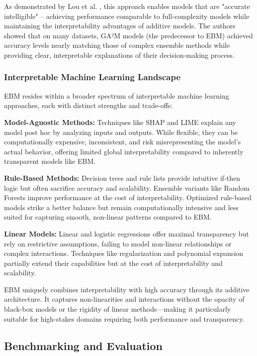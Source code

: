 \documentclass[12pt]{article}
\begin{document}
As demonstrated by Lou et al. \cite{lou2013}, this approach enables models that are "accurate intelligible" – achieving performance comparable to full-complexity models while maintaining the interpretability advantages of additive models. The authors showed that on many datasets, GA²M models (the predecessor to EBM) achieved accuracy levels nearly matching those of complex ensemble methods while providing clear, interpretable explanations of their decision-making process.



\subsubsection{Interpretable Machine Learning Landscape}

EBM resides within a broader spectrum of interpretable machine learning approaches, each with distinct strengths and trade-offs:

\textbf{Model-Agnostic Methods:} Techniques like SHAP \cite{lundberg2017} and LIME \cite{ribeiro2016} explain any model post hoc by analyzing inputs and outputs. While flexible, they can be computationally expensive, inconsistent, and risk misrepresenting the model's actual behavior, offering limited global interpretability compared to inherently transparent models like EBM.

\textbf{Rule-Based Methods:} Decision trees and rule lists provide intuitive if-then logic but often sacrifice accuracy and scalability. Ensemble variants like Random Forests improve performance at the cost of interpretability. Optimized rule-based models strike a better balance but remain computationally intensive and less suited for capturing smooth, non-linear patterns compared to EBM.

\textbf{Linear Models:} Linear and logistic regressions offer maximal transparency but rely on restrictive assumptions, failing to model non-linear relationships or complex interactions. Techniques like regularization and polynomial expansion partially extend their capabilities but at the cost of interpretability and scalability.

EBM uniquely combines interpretability with high accuracy through its additive architecture. It captures non-linearities and interactions without the opacity of black-box models or the rigidity of linear methods—making it particularly suitable for high-stakes domains requiring both performance and transparency.

\subsection{Benchmarking and Evaluation}
\end{document}

